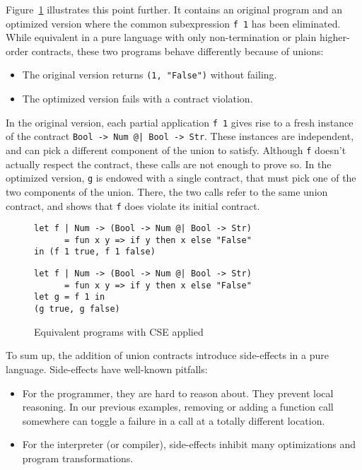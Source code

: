 \documentclass[sigplan,10pt,review,anonymous]{acmart}
\newcommand{\unsure}[2][1=]{}
\newcommand{\nickel}[1]{\lstinline[language=nickel]{#1}}
\begin{document}
Figure~\ref{fig:optimized-programs} illustrates this point further. It contains
an original program and an optimized version where the common subexpression
\nickel{f 1} has been eliminated. While equivalent in a pure language with only
non-termination or plain higher-order contracts, these two programs behave
differently because of unions:

\begin{itemize}
    \item The original version returns \nickel{(1, "False")} without failing.
    \item The optimized version fails with a contract violation.
\end{itemize}

In the original version, each partial application \nickel{f 1} gives rise to a
fresh instance of the contract \nickel{Bool -> Num @| Bool -> Str}. These
instances are independent, and can pick a different component of the union to
satisfy. Although \nickel{f} doesn't actually respect the contract, these calls
are not enough to prove so. In the optimized version, \nickel{g} is endowed with
a single contract, that must pick one of the two components of the union. There,
the two calls refer to the same union contract, and shows that \nickel{f} does
violate its initial contract.

\begin{figure}[h]
\begin{lstlisting}[language=nickel, title=Original]
let f | Num -> (Bool -> Num @| Bool -> Str)
      = fun x y => if y then x else "False"
in (f 1 true, f 1 false)
\end{lstlisting}
\begin{lstlisting}[language=nickel, title=Optimized]
let f | Num -> (Bool -> Num @| Bool -> Str)
      = fun x y => if y then x else "False"
let g = f 1 in
(g true, g false)
\end{lstlisting}
\caption{Equivalent programs with CSE applied}
\label{fig:optimized-programs}
\end{figure}

\unsure{These arguments should go in the purity section}
To sum up, the addition of union contracts introduce side-effects in a pure
language. Side-effects have well-known pitfalls:
\begin{itemize}
    \item For the programmer, they are hard to reason about. They prevent local
        reasoning. In our previous examples, removing or adding a function call
        somewhere can toggle a failure in a call at a totally different
        location.
    \item For the interpreter (or compiler), side-effects inhibit many optimizations and
        program transformations.
\end{itemize}
\end{document}

